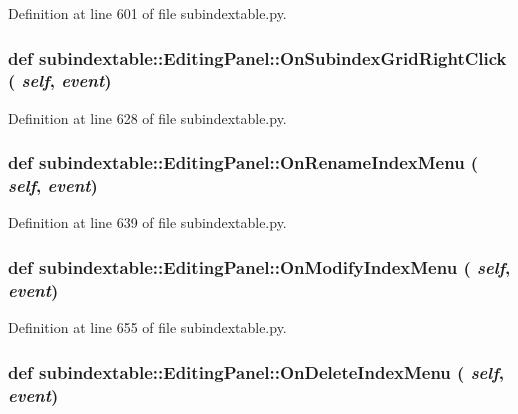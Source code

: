 Definition at line 601 of file subindextable.py.\hypertarget{classsubindextable_1_1EditingPanel_344f9900211cd9756fec6746d19fa8da}{
\subsubsection[OnSubindexGridRightClick]{\setlength{\rightskip}{0pt plus 5cm}def subindextable::Editing\-Panel::On\-Subindex\-Grid\-Right\-Click ( {\em self},  {\em event})}}
\label{classsubindextable_1_1EditingPanel_344f9900211cd9756fec6746d19fa8da}




Definition at line 628 of file subindextable.py.\hypertarget{classsubindextable_1_1EditingPanel_67682b6edb7711ee6374bf010631be1d}{
\subsubsection[OnRenameIndexMenu]{\setlength{\rightskip}{0pt plus 5cm}def subindextable::Editing\-Panel::On\-Rename\-Index\-Menu ( {\em self},  {\em event})}}
\label{classsubindextable_1_1EditingPanel_67682b6edb7711ee6374bf010631be1d}




Definition at line 639 of file subindextable.py.\hypertarget{classsubindextable_1_1EditingPanel_795b4098297fac0d785299aa7de25cf5}{
\subsubsection[OnModifyIndexMenu]{\setlength{\rightskip}{0pt plus 5cm}def subindextable::Editing\-Panel::On\-Modify\-Index\-Menu ( {\em self},  {\em event})}}
\label{classsubindextable_1_1EditingPanel_795b4098297fac0d785299aa7de25cf5}




Definition at line 655 of file subindextable.py.\hypertarget{classsubindextable_1_1EditingPanel_11add8224763f37383fabc67e0804bec}{
\subsubsection[OnDeleteIndexMenu]{\setlength{\rightskip}{0pt plus 5cm}def subindextable::Editing\-Panel::On\-Delete\-Index\-Menu ( {\em self},  {\em event})}}
\label{classsubindextable_1_1EditingPanel_11add8224763f37383fabc67e0804bec}




